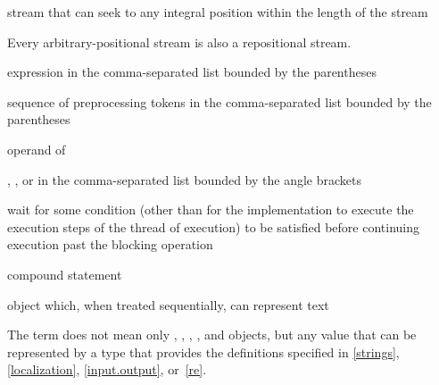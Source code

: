%
stream that can seek to any integral position within
the length of the stream

\begin{defnote}
Every arbitrary-positional stream is also a repositional stream.
\end{defnote}

%
 expression in the
comma-separated list bounded by the parentheses

%
%
 sequence of preprocessing tokens in the
comma-separated list bounded by the parentheses

%
%
 operand of 

%
%
,
, or
 in the comma-separated
list bounded by the angle brackets

%
wait for some condition (other than for the implementation to execute
the execution steps of the thread of execution) to be satisfied before
continuing execution past the blocking operation

%
compound statement

%
object which,
when treated sequentially,
can represent text

\begin{defnote}
The term does not mean only
,
,
,
,
and
objects,
but any value that can be represented by a type
that provides the definitions specified in
\ref{strings}, \ref{localization}, \ref{input.output}, or~\ref{re}.
\end{defnote}

